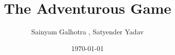 \documentclass{book}  %
\begin{document}
\title{\textbf{The Adventurous Game}  }%
\author {Sainyam Galhotra , Satyender Yadav}
\date{\today}
\maketitle
\frontmatter

\tableofcontents
\mainmatter



\end{document}
